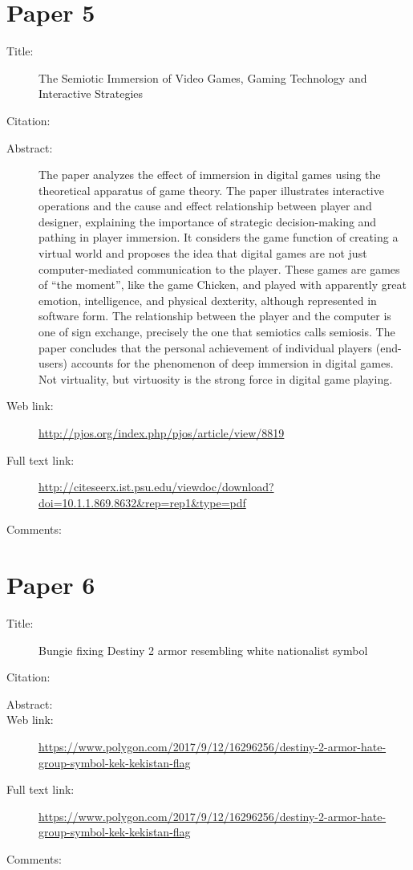 \documentclass{scrartcl}
\begin{document}
\section*{Paper 5}
\begin{description}
\item[Title:] The Semiotic Immersion of Video Games, Gaming Technology and Interactive Strategies
\item[Citation:] \cite{nieva}
\item[Abstract:] The paper analyzes the effect of immersion in digital games using the theoretical apparatus of game theory. The paper illustrates interactive operations and the cause and effect relationship between player and designer, explaining the importance of strategic decision-making and pathing in player immersion. It considers the game function of creating a virtual world and proposes the idea that digital games are not just computer-mediated communication to the player. These games are games of “the moment”, like the game Chicken, and played with apparently great emotion, intelligence, and physical dexterity, although represented in software form. The relationship between the player and the computer is one of sign exchange, precisely the one that semiotics calls semiosis. The paper concludes that the personal achievement of individual players (end-users) accounts for the phenomenon of deep immersion in digital games. Not virtuality, but virtuosity is the strong force in digital game playing.
\item[Web link:]\url {http://pjos.org/index.php/pjos/article/view/8819}
\item[Full text link:]\url {http://citeseerx.ist.psu.edu/viewdoc/download?doi=10.1.1.869.8632&rep=rep1&type=pdf}
\item[Comments:] 
\end{description}

\section*{Paper 6}
\begin{description}
\item[Title:] Bungie fixing Destiny 2 armor resembling white nationalist symbol
\item[Citation:] \cite{samit}
\item[Abstract:]
\item[Web link:]\url {https://www.polygon.com/2017/9/12/16296256/destiny-2-armor-hate-group-symbol-kek-kekistan-flag}
\item[Full text link:]\url {https://www.polygon.com/2017/9/12/16296256/destiny-2-armor-hate-group-symbol-kek-kekistan-flag}
\item[Comments:] 
\end{description}
\end{document}
